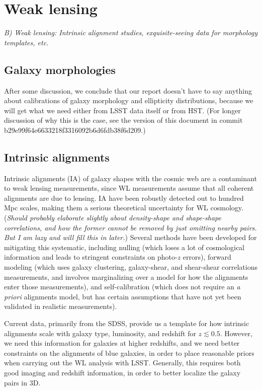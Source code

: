 \section{Weak lensing}
\label{sec:wl}

{\it B) Weak lensing: Intrinsic alignment studies, exquisite-seeing data
for morphology templates, etc.}

\subsection{Galaxy morphologies}

After some discussion, we conclude that our report doesn't have to say anything about calibrations
of galaxy morphology and ellipticity distributions, because we will get what we need either from
LSST data itself or from HST.  (For longer discussion of why this is the case, see the version of
this document in commit b29e99f64e6633218f3316092b6d6fdb38f6d209.)

\subsection{Intrinsic alignments}

Intrinsic alignments (IA) of galaxy shapes with the cosmic web are a contaminant to weak lensing
measurements, since WL measurements assume that all coherent alignments are due to lensing. IA have
been robustly detected out to hundred Mpc scales, making them a serious theoretical uncertainty for
WL cosmology.  ({\em Should probably elaborate slightly about density-shape and shape-shape
  correlations, and how the former cannot be removed by just omitting nearby pairs.  But I am lazy
  and will fill this in later.}) Several methods have been developed for mitigating this systematic,
including nulling (which loses a lot of cosmological information and leads to stringent constraints
on photo-$z$ errors), forward modeling (which uses galaxy clustering, galaxy-shear, and shear-shear
correlations measurements, and involves marginalizing over a model for how the alignments enter
those measurements), and self-calibration (which does not require an {\em a priori} alignments
model, but has certain assumptions that have not yet been validated in realistic measurements).

Current data, primarily from the SDSS, provide us a template for how intrinsic alignments scale with
galaxy type, luminosity, and redshift for $z\lesssim 0.5$.  However, we need this information for
galaxies at higher redshifts, and we need better constraints on the alignments of blue galaxies, in
order to place reasonable priors when carrying out the WL analysis with LSST. Generally, this
requires both good imaging and redshift information, in order to better localize the galaxy pairs in
3D.

